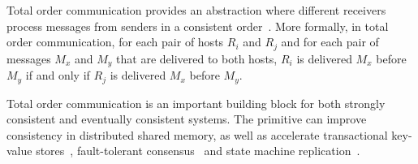 Total order communication provides an abstraction where different receivers process messages from senders in a consistent order~\cite{kshemkalyani2011distributed}.
More formally, in total order communication, for each pair of hosts $R_i$ and $R_j$ and for each pair of messages $M_x$ and $M_y$ that are delivered to both hosts, $R_i$ is delivered $M_x$ before $M_y$ if and only if $R_j$ is delivered $M_x$ before $M_y$.

Total order communication is an important building block for both strongly consistent and eventually consistent systems.
The primitive can improve consistency in distributed shared memory, as well as accelerate transactional key-value stores~\cite{ports2015designing, eris}, fault-tolerant consensus~\cite{li2016just} and state machine replication~\cite{state-machine-replication}.




